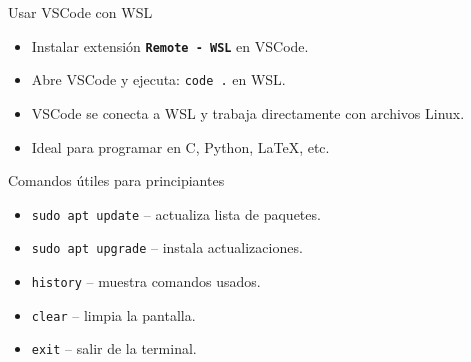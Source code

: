 \documentclass[aspectratio=169,professionalfonts]{beamer}
\begin{document}
\begin{frame}{Usar VSCode con WSL}
  \begin{itemize}
    \item Instalar extensión \texttt{\textbf{Remote - WSL}} en VSCode.
    \item Abre VSCode y ejecuta: \texttt{code .} en WSL.
    \item VSCode se conecta a WSL y trabaja directamente con archivos Linux.
    \item Ideal para programar en C, Python, LaTeX, etc.
  \end{itemize}
\end{frame}

\begin{frame}{Comandos útiles para principiantes}
  \begin{itemize}
    \item \texttt{sudo apt update} -- actualiza lista de paquetes.
    \item \texttt{sudo apt upgrade} -- instala actualizaciones.
    \item \texttt{history} -- muestra comandos usados.
    \item \texttt{clear} -- limpia la pantalla.
    \item \texttt{exit} -- salir de la terminal.
  \end{itemize}
\end{frame}
\end{document}
